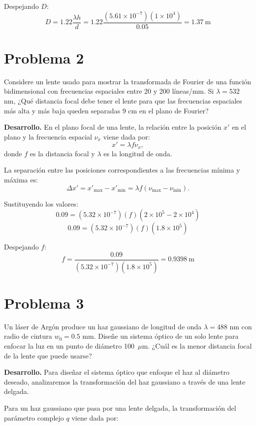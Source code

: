 \documentclass[11pt]{article}
\begin{document}
Despejando \(D\):
\[
D = 1.22\frac{\lambda h}{d} = 1.22\frac{(5.61\times 10^{-7})(1\times 10^4)}{0.05} = 1.37\ \mathrm{m}
\]

\section*{Problema 2}
\noindent Considere un lente usado para mostrar la transformada de Fourier de una función bidimensional con frecuencias espaciales entre 20 y 200 líneas/mm. Si \(\lambda = 532\) nm, ¿Qué distancia focal debe tener el lente para que las frecuencias espaciales más alta y más baja queden separadas 9 cm en el plano de Fourier?

\vspace{0.5em}
\noindent\textbf{Desarrollo.}
En el plano focal de una lente, la relación entre la posición \(x'\) en el plano y la frecuencia espacial \(\nu_x\) viene dada por:
\[
x' = \lambda f \nu_x,
\]
donde \(f\) es la distancia focal y \(\lambda\) es la longitud de onda.

La separación entre las posiciones correspondientes a las frecuencias mínima y máxima es:
\[
\Delta x' = x'_{\max} - x'_{\min} = \lambda f (\nu_{\max} - \nu_{\min}).
\]

Sustituyendo los valores:
\[
0.09 = (5.32\times 10^{-7})(f)(2\times 10^5 - 2\times 10^4)
\]
\[
0.09 = (5.32\times 10^{-7})(f)(1.8\times 10^5)
\]

Despejando \(f\):
\[
f = \frac{0.09}{(5.32\times 10^{-7})(1.8\times 10^5)} = 0.9398\ \mathrm{m}
\]

\section*{Problema 3}
\noindent  Un láser de Argón produce un haz gaussiano de longitud de onda $\lambda = 488$ nm con radio de cintura $w_0 = 0.5$ mm. Diseñe un sistema óptico de un solo lente para enfocar la luz en un punto de diámetro 100~$\mu$m. ¿Cuál es la menor distancia focal de la lente que puede usarse?

\vspace{0.5em}
\noindent\textbf{Desarrollo.}
Para diseñar el sistema óptico que enfoque el haz al diámetro deseado, analizaremos la transformación del haz gaussiano a través de una lente delgada.

Para un haz gaussiano que pasa por una lente delgada, la transformación del parámetro complejo \(q\) viene dada por:
\end{document}
